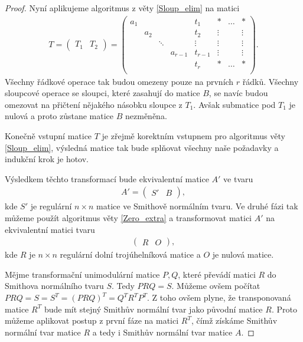 \begin{proof}
Nyní aplikujeme algoritmus z věty \ref{Sloup_elim} na matici
\begin{align*}
T =
    \left(
    \begin{array}{c|c}
        T_1 & T_2
    \end{array}
    \right)
  =
    \left(
    \begin{array}{ccccc|ccc}
        a_1 &     &        &         & t_1     & \ast   & \hdots & \ast   \\
            & a_2 &        &         & t_2     & \vdots &        & \vdots \\
            &     & \ddots &         & \vdots  & \vdots &        & \vdots \\
            &     &        & a_{r-1} & t_{r-1} & \vdots &        & \vdots \\
            &     &        &         & t_r     & \ast   & \hdots & \ast   \\
    \end{array}
    \right)
.
\end{align*}
Všechny řádkové operace tak budou omezeny pouze na prvních $ r $ řádků. Všechny
sloupcové operace se sloupci, které zasahují do matice $ B $,
se navíc budou omezovat na přičtení nějakého násobku sloupce z $ T_1 $. Avšak
submatice pod $ T_1 $ je nulová a proto zůstane matice $ B $ nezměněna.

Konečně vstupní matice $ T $ je zřejmě korektním vstupnem pro algoritmus
věty \ref{Sloup_elim}, výsledná matice tak bude splňovat všechny naše požadavky
a indukční krok je hotov.

Výsledkem těchto transformací bude ekvivalentní matice $ A' $ ve tvaru
\begin{align*}
A' =
    \left(
    \begin{array}{c|c}
        S' & B
    \end{array}
    \right)
,
\end{align*}
kde $ S' $ je regulární $ n \times n $ matice ve Smithově normálním tvaru.
Ve druhé fázi tak můžeme použít algoritmus věty \ref{Zero_extra} a transformovat
matici $ A' $ na ekvivalentní matici tvaru
\begin{align*}
    \left(
    \begin{array}{c|c}
        R & O
    \end{array}
    \right)
,
\end{align*}
kde $ R $ je $ n \times n $ regulární dolní trojúhelníková matice a $ O $ je
nulová matice.

Mějme transformační unimodulární matice $ P, Q $, které převádí matici $ R $
do Smithova normálního tvaru $ S $. Tedy $ P R Q = S $. Můžeme ovšem počítat
$ P R Q = S = S^T = (P R Q)^T = Q^T R^T P^T $. Z toho ovšem plyne, že
transponovaná matice $ R^T $ bude mít stejný Smithův normální tvar jako původní
matice $ R $. Proto můžeme aplikovat postup z první fáze na matici $ R^T $,
čímž získáme Smithův normální tvar matice $ R $ a tedy i Smithův normální tvar
matice $ A $.
\end{proof}